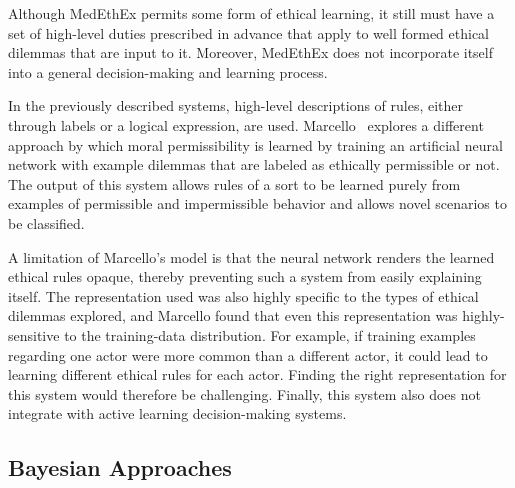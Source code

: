 \documentclass[11pt]{article}
\newcommand\jmnote[1]{\textcolor{red}{James: #1}}
\begin{document}
Although MedEthEx permits some form of ethical learning, it still must have a set of high-level duties prescribed in advance that apply to well formed ethical dilemmas that are input to it. Moreover, MedEthEx does not incorporate itself into a general decision-making and learning process.

In the previously described systems, high-level descriptions of rules, either through labels or a logical expression, are used. Marcello~ explores a different approach by which moral permissibility is learned by training an artificial neural network with example dilemmas that are labeled as ethically permissible or not. The output of this system allows rules of a sort to be learned purely from examples of permissible and impermissible behavior and allows novel scenarios to be classified. 

A limitation of Marcello's model is that the neural network renders the learned ethical rules opaque, thereby preventing such a system from easily explaining itself. The representation used was also highly specific to the types of ethical dilemmas explored, and Marcello found that even this representation was highly-sensitive to the training-data distribution. For example, if training examples regarding one actor were more common than a different actor, it could lead to learning different ethical rules for each actor. Finding the right representation for this system would therefore be challenging. Finally, this system also does not integrate with active learning decision-making systems. 


\subsection{Bayesian Approaches}
\end{document}
